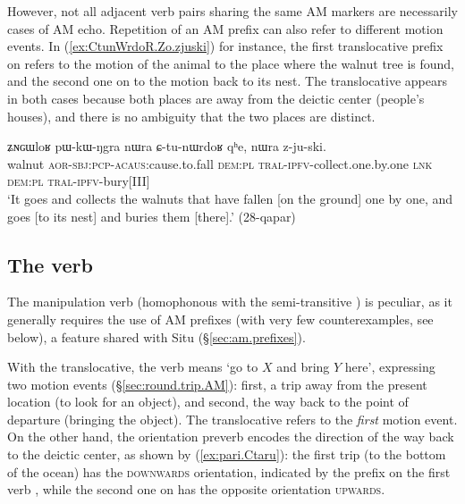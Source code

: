 However, not all adjacent verb pairs sharing the same AM markers are necessarily cases of AM echo. Repetition of an AM prefix can also refer to different motion events. In (\ref{ex:CtunWrdoR.Zo.zjuski}) for instance, the first translocative prefix on  refers to the motion of the animal to the place where the walnut tree is found, and the second one on  to the motion back to its nest. The translocative appears in both cases because both places are away from the deictic center (people's houses), and there is no ambiguity that the two places are distinct.

\begin{exe}
\ex \label{ex:CtunWrdoR.Zo.zjuski}
\gll   ʑɴɢɯloʁ pɯ-kɯ-ŋgra nɯra ɕ-tu-nɯrdoʁ qʰe, nɯra z-ju-ski. \\
walnut \textsc{aor}-\textsc{sbj}:\textsc{pcp}-\textsc{acaus}:cause.to.fall \textsc{dem}:\textsc{pl}
\textsc{tral}-\textsc{ipfv}-collect.one.by.one \textsc{lnk} \textsc{dem}:\textsc{pl} \textsc{tral}-\textsc{ipfv}-bury[III] \\
\glt `It goes and collects the walnuts that have fallen [on the ground] one by one, and goes [to its nest] and buries them [there].' (28-qapar) 
\end{exe}

\subsection{The verb } \label{sec:ru.fetch}
The manipulation verb  (homophonous with the semi-transitive ) is peculiar, as it generally requires the use of AM prefixes (with very few counterexamples, see below), a feature shared with Situ (§\ref{sec:am.prefixes}). 

With the translocative, the verb  means `go to $X$ and bring $Y$ here',  expressing two motion events (§\ref{sec:round.trip.AM}): first, a trip away from the present location (to look for an object), and second, the way back to the point of departure (bringing the object). The translocative refers to the \textit{first} motion event.  On the other hand, the orientation preverb encodes the direction of the way back to the deictic center, as shown by (\ref{ex:pari.Ctaru}): the first trip (to the bottom of the ocean) has the \textsc{downwards} orientation, indicated by the prefix on the first verb , while the second one on  has the opposite orientation \textsc{upwards}.

